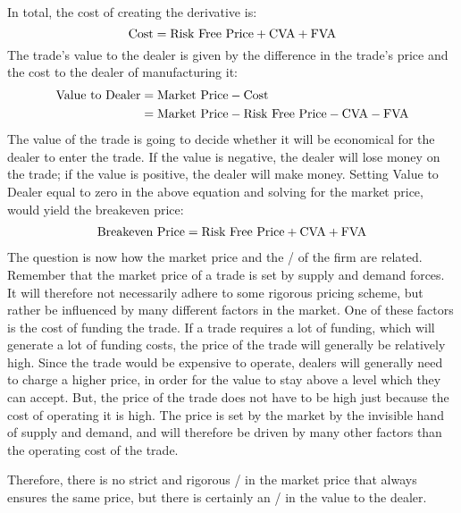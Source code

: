 \documentclass[main.tex]{subfiles}
\begin{document}
    In total, the cost of creating the derivative is:
        \begin{equation*}
            \text{Cost} = \text{Risk Free Price} + \CVA/ + \FVA/
        \end{equation*}
    The trade's value to the dealer is given by the difference in the trade's price
    and the cost to the dealer of manufacturing it:
        \begin{align*}
            \text{Value to Dealer} 
            &=
            \text{Market Price}
            -
            \text{Cost} 
            \\
            &= \text{Market Price} - \text{Risk Free Price} - \CVA/ - \FVA/
        \end{align*}
    The value of the trade is going to decide whether it will be economical 
    for the dealer to enter the trade. 
    If the value is negative, the dealer will lose money on the trade;
    if the value is positive, the dealer will make money.
    Setting Value to Dealer equal to zero in the above equation and solving for the market price, 
    would yield the breakeven price:
        \begin{align*}
            \text{Breakeven Price}
            =
            \text{Risk Free Price} + \CVA/ + \FVA/
        \end{align*}
    The question is now how the market price and the \FVA/ of the firm are related.
    Remember that the market price of a trade is set by supply and demand forces.
    It will therefore not necessarily adhere to some rigorous pricing scheme,
    but rather be influenced by many different factors in the market.
    One of these factors is the cost of funding the trade.
    If a trade requires a lot of funding, which will generate a lot of funding costs,
    the price of the trade will generally be relatively high.
    Since the trade would be expensive to operate, 
    dealers will generally need to charge a higher price, 
    in order for the value to stay above a level which they can accept.
    But, the price of the trade does not have to be high 
    just because the cost of operating it is high.
    The price is set by the market by the invisible hand of supply and demand,
    and will therefore be driven by many other factors than the operating cost of the trade.
    
    Therefore, there is no strict and rigorous \FVA/ in the market price that always ensures the same price, 
    but there is certainly an \FVA/ in the value to the dealer.
\end{document}
